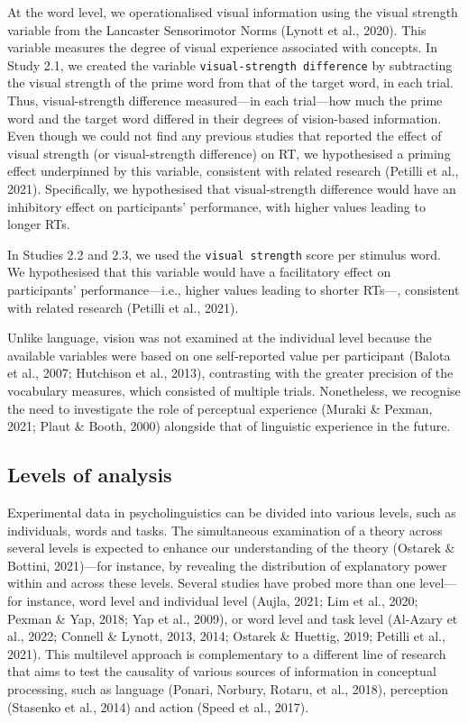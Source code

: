 \documentclass[
  12pt,
  man,floatsintext]{apa7}
\begin{document}
At the word level, we operationalised visual information using the visual strength variable from the Lancaster Sensorimotor Norms (Lynott et al., 2020). This variable measures the degree of visual experience associated with concepts. In Study 2.1, we created the variable \texttt{visual-strength\ difference} by subtracting the visual strength of the prime word from that of the target word, in each trial. Thus, visual-strength difference measured---in each trial---how much the prime word and the target word differed in their degrees of vision-based information. Even though we could not find any previous studies that reported the effect of visual strength (or visual-strength difference) on RT, we hypothesised a priming effect underpinned by this variable, consistent with related research (Petilli et al., 2021). Specifically, we hypothesised that visual-strength difference would have an inhibitory effect on participants' performance, with higher values leading to longer RTs.

In Studies 2.2 and 2.3, we used the \texttt{visual\ strength} score per stimulus word. We hypothesised that this variable would have a facilitatory effect on participants' performance---i.e., higher values leading to shorter RTs---, consistent with related research (Petilli et al., 2021).

Unlike language, vision was not examined at the individual level because the available variables were based on one self-reported value per participant (Balota et al., 2007; Hutchison et al., 2013), contrasting with the greater precision of the vocabulary measures, which consisted of multiple trials. Nonetheless, we recognise the need to investigate the role of perceptual experience (Muraki \& Pexman, 2021; Plaut \& Booth, 2000) alongside that of linguistic experience in the future.

\hypertarget{levels-of-analysis}{%
\subsection{Levels of analysis}\label{levels-of-analysis}}

Experimental data in psycholinguistics can be divided into various levels, such as individuals, words and tasks. The simultaneous examination of a theory across several levels is expected to enhance our understanding of the theory (Ostarek \& Bottini, 2021)---for instance, by revealing the distribution of explanatory power within and across these levels. Several studies have probed more than one level---for instance, word level and individual level (Aujla, 2021; Lim et al., 2020; Pexman \& Yap, 2018; Yap et al., 2009), or word level and task level (Al-Azary et al., 2022; Connell \& Lynott, 2013, 2014; Ostarek \& Huettig, 2019; Petilli et al., 2021). This multilevel approach is complementary to a different line of research that aims to test the causality of various sources of information in conceptual processing, such as language (Ponari, Norbury, Rotaru, et al., 2018), perception (Stasenko et al., 2014) and action (Speed et al., 2017).
\end{document}
